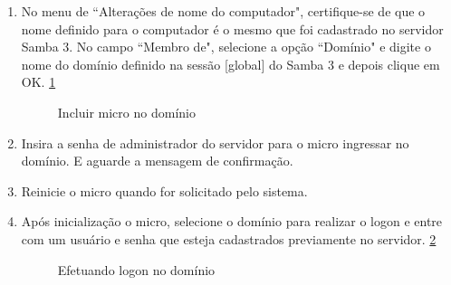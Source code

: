 \begin{enumerate}
		\pagebreak 

	\item {No menu de ``Alterações de nome do computador", certifique-se de que o nome definido para o computador é o mesmo que foi cadastrado no servidor Samba 3. No campo ``Membro de", selecione a opção ``Domínio" e digite o nome do domínio definido na sessão [global] do Samba 3 e depois clique em OK. \ref{incluir_dominio}} 
			\begin{figure}[ht]
		   			\centering
		   			\caption{Incluir micro no domínio}
		    		\label{incluir_dominio}
			\end{figure}
	 
	
	\item {Insira a senha de administrador do servidor para o micro ingressar no domínio. E aguarde a mensagem de confirmação.} %

	\item {Reinicie o micro quando for solicitado pelo sistema.}

	\item {Após inicialização o micro, selecione o domínio para realizar o logon e entre com um usuário e senha que esteja cadastrados previamente no servidor. \ref{logon}}
	\begin{figure}[ht]
			\centering
			\caption{Efetuando logon no domínio}
			\label{logon}
	\end{figure}

\end{enumerate}

